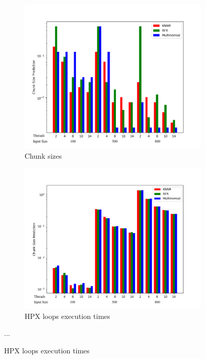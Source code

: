 \documentclass[12pt]{article}
\begin{document}
\begin{figure}[h]
	\centering
	\begin{subfigure}[b]{0.5\textwidth}
		\centering
		\includegraphics[width=\textwidth]{matrix_mult_corrected_predictions_bar.png}
		\caption[Network2]%
		{{Chunk sizes}}    
	\end{subfigure}
	\hfill
	\begin{subfigure}[b]{0.49\textwidth}  
		\centering 
		\includegraphics[width=\textwidth]{matrix_mult_corrected_times_bar.png}
		\caption[]%
		{{HPX loops execution times}}    
	\end{subfigure}
	{...} 
	
\end{figure}
\end{document}
